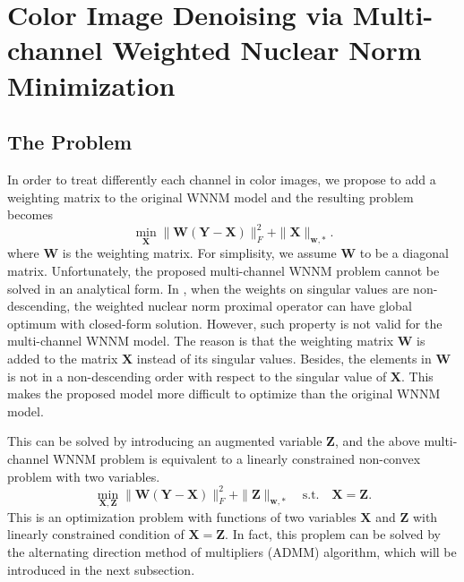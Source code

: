 \documentclass[10pt,twocolumn,letterpaper,sort&compress]{article}
\begin{document}
\section{Color Image Denoising via Multi-channel Weighted Nuclear Norm Minimization}

\subsection{The Problem}
In order to treat differently each channel in color images, we propose to add a weighting matrix to the original WNNM model and the resulting problem becomes
\begin{equation}
\min_{\mathbf{X}}\|\mathbf{W}(\mathbf{Y}-\mathbf{X})\|_{F}^{2}
+ 
\|\mathbf{X}\|_{\bm{w},*}.
\end{equation}
where $\mathbf{W}$ is the weighting matrix. For simplisity, we assume $\mathbf{W}$ to be a diagonal matrix. Unfortunately, the proposed multi-channel WNNM problem cannot be solved in an analytical form. In \cite{wnnmijcv}, when the weights on singular values are non-descending, the weighted nuclear norm proximal operator can have global optimum with closed-form solution. However, such property is not valid for the multi-channel WNNM model. The reason is that the weighting matrix $\mathbf{W}$ is added to the matrix $\mathbf{X}$ instead of its singular values. Besides, the elements in $\mathbf{W}$ is not in a non-descending order with respect to the singular value of $\mathbf{X}$. This makes the proposed model more difficult to optimize than the original WNNM model.

This can be solved by introducing an augmented variable $\mathbf{Z}$, and the above multi-channel WNNM problem is equivalent to a linearly constrained non-convex problem with two variables.
\begin{equation}
\min_{\mathbf{X},\mathbf{Z}}\|\mathbf{W}(\mathbf{Y}-\mathbf{X})\|_{F}^{2}
+
\|\mathbf{Z}\|_{\bm{w},*}
\quad
\text{s.t.}
\quad
\mathbf{X}=\mathbf{Z}.
\end{equation}
This is an optimization problem with functions of two variables $\mathbf{X}$ and $\mathbf{Z}$ with linearly constrained condition of $\mathbf{X}=\mathbf{Z}$. In fact, this proplem can be solved by the alternating direction method of multipliers (ADMM) algorithm, which will be introduced in the next subsection.
\end{document}
